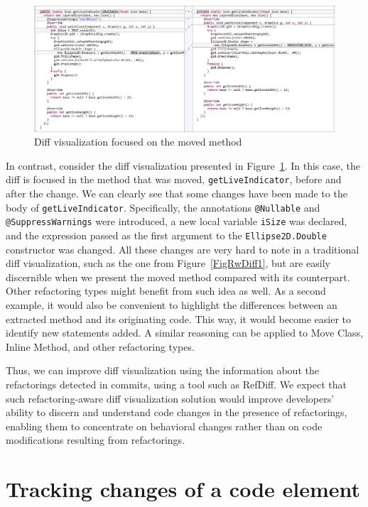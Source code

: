 \begin{figure}[bp]
\centering
\includegraphics[width=\linewidth]{img/c2.png}
\caption{Diff visualization focused on the moved method}
\label{FigRwDiff2}
\end{figure}

In contrast, consider the diff visualization presented in Figure~\ref{FigRwDiff2}. In this case, the diff is focused in the method that was moved, \texttt{getLiveIndicator}, before and after the change. We can clearly see that some changes have been made to the body of \texttt{getLiveIndicator}. Specifically, the annotations \texttt{@Nullable} and \texttt{@SuppressWarnings} were introduced, a new local variable \texttt{iSize} was declared, and the expression passed as the first argument to the \texttt{Ellipse2D.Double} constructor was changed.
All these changes are very hard to note in a traditional diff visualization, such as the one from Figure~\ref{FigRwDiff1}, but are easily discernible when we present the moved method compared with its counterpart.
Other refactoring types might benefit from such idea as well.
As a second example, it would also be convenient to highlight the differences between an extracted method and its originating code. This way, it would become easier to identify new statements added.
A similar reasoning can be applied to Move Class, Inline Method, and other refactoring types.



Thus, we can improve diff visualization using the information about the refactorings detected in commits, using a tool such as RefDiff.
We expect that such refactoring-aware diff visualization solution would improve developers' ability to discern and understand code changes in the presence of refactorings, enabling them to concentrate on behavioral changes rather than on code modifications resulting from refactorings.


\section{Tracking changes of a code element}
\label{SecAppTrackChanges}

